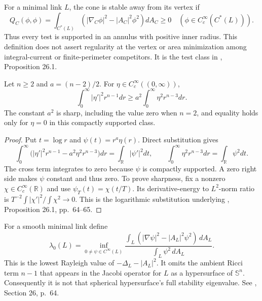 \begin{definition}\label{def:cone-punctured-stability}
For a minimal link $L$, the cone is stable away from its vertex if
\[
 Q_C(\phi,\phi)=\int_{C^*(L)}
 \left(|\nabla_C\phi|^2-|A_C|^2\phi^2\right)dA_C\geq0
 \quad(\phi\in C_c^\infty(C^*(L))).
\]
Thus every test is supported in an annulus with positive inner radius. This definition does not assert regularity at the vertex or area minimization among integral-current or finite-perimeter competitors. It is the test class in \cite{ChMin}, Proposition 26.1.
\end{definition}

\begin{lemma}\label{lem:radial-hardy}
Let $n\geq2$ and $a=(n-2)/2$. For $\eta\in C_c^\infty((0,\infty))$,
\[
 \int_0^\infty|\eta'|^2r^{n-1}dr
 \geq a^2\int_0^\infty\eta^2r^{n-3}dr.
\]
The constant $a^2$ is sharp, including the value zero when $n=2$, and equality holds only for $\eta=0$ in this compactly supported class.
\end{lemma}
\begin{proof}
Put $t=\log r$ and $\psi(t)=r^a\eta(r)$. Direct substitution gives
\[
 \int_0^\infty\bigl(|\eta'|^2r^{n-1}-a^2\eta^2r^{n-3}\bigr)dr
 =\int_{\mathbb R}|\psi'|^2dt,
 \qquad \int_0^\infty\eta^2r^{n-3}dr=\int_{\mathbb R}\psi^2dt.
\]
The cross term integrates to zero because $\psi$ is compactly supported. A zero right side makes $\psi$ constant and thus zero. To prove sharpness, fix a nonzero $\chi\in C_c^\infty(\mathbb R)$ and use $\psi_T(t)=\chi(t/T)$. Its derivative-energy to $L^2$-norm ratio is $T^{-2}\int|\chi'|^2/\int\chi^2\to0$. This is the logarithmic substitution underlying \cite{ChMin}, Proposition 26.1, pp.~64--65.
\end{proof}

\begin{definition}\label{def:link-rayleigh}
For a smooth minimal link define
\[
 \lambda_0(L)=\inf_{0\ne\psi\in C^\infty(L)}
 \frac{\int_L(|\nabla\psi|^2-|A_L|^2\psi^2)\,dA_L}
 {\int_L\psi^2\,dA_L}.
\]
This is the lowest Rayleigh value of $-\Delta_L-|A_L|^2$. It omits the ambient Ricci term $n-1$ that appears in the Jacobi operator for $L$ as a hypersurface of $\mathbb S^n$. Consequently it is not that spherical hypersurface's full stability eigenvalue. See \cite{ChMin}, Section 26, p.~64.
\end{definition}

